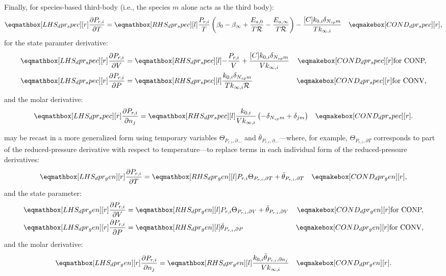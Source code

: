 \documentclass[12pt,number,sort&compress]{elsarticle}
\newcommand{\ns}{N_{sp}}
\newcommand{\conp}{CONP}
\newcommand{\conv}{CONV}
\newcommand{\dconp}{\ifmmode\text{for \conp,}\else for \conp,\fi}
\newcommand{\dconv}{\ifmmode\text{for \conv,}\else for \conv,\fi}
\newcommand{\Ru}{\mathcal{R}}
\begin{document}
Finally, for species-based third-body (i.e., the species $m$ alone acts as the third body):
\begin{align}
 \lhs{dpr_spec}{\frac{\partial P_{r, i} }{\partial T }} &=\rhs{dpr_spec}{\frac{P_{r, i}}{T} \left(\beta_{0} - \beta_{\infty} + \frac{E_{a, 0}}{T \Ru} - \frac{E_{a, \infty}}{T \Ru}\right) - \frac{[C] k_{0, i} \delta_{\ns m}}{T k_{\infty, i}}} & \cond{dpr_spec}{,} \label{e:dpr_spec_dt}
\end{align}
for the state paramter derivative:
\begin{subequations}
 \label{e:dpr_spec_de}
 \begin{align}
  \lhs{dpr_spec}{\frac{\partial P_{r, i} }{\partial V }} &= \rhs{dpr_spec}{- \frac{P_{r, i}}{V} + \frac{[C] k_{0, i} \delta_{\ns m}}{V k_{\infty, i}}} & \cond{dpr_spec}{\dconp}\\
  \lhs{dpr_spec}{\frac{\partial P_{r, i} }{\partial P }} &= \rhs{dpr_spec}{\frac{k_{0, i} \delta_{\ns m}}{T k_{\infty, i} \Ru}} & \cond{dpr_spec}{\dconv}
 \end{align}
\end{subequations}
and the molar derivative:
\begin{align}
 \lhs{dpr_spec}{\frac{\partial P_{r, i} }{\partial n_j }} &=\rhs{dpr_spec}{\frac{k_{0, i}}{V k_{\infty, i}} \left(- \delta_{\ns m} + \delta_{j m}\right)} & \cond{dpr_spec}{.} \label{e:dpr_spec_dnj}
\end{align}


 may be recast in a more generalized form using temporary variables $\Theta_{P_{r, i}, \partial \ldots}$ and $\bar{\theta}_{P_{r, i}, \partial \ldots}$---where, for example, $\Theta_{P_{r,i}, \partial T}$ corresponds to part of the reduced-pressure derivative with respect to temperature---to replace terms in each individual form of the reduced-pressure derivatives:
\begin{align}
 \lhs{dpr_gen}{\frac{\partial P_{r, i} }{\partial T } } &= \rhs{dpr_gen}{P_{r, i} \Theta_{P_{r,i}, \partial T} + \bar{\theta}_{P_{r, i}, \partial T}} & \cond{dpr_gen}{,} \label{e:dpr_dt}
\end{align}
and the state parameter:
\begin{subequations}
 \label{e:dpr_de}
 \begin{align}
  \lhs{dpr_gen}{\frac{\partial P_{r, i} }{\partial V}} &= \rhs{dpr_gen}{P_{r, i} \Theta_{P_{r,i}, \partial V} + \bar{\theta}_{P_{r, i}, \partial V}} & \cond{dpr_gen}{\dconp} \\
  \lhs{dpr_gen}{\frac{\partial P_{r, i} }{\partial P}} &= \rhs{dpr_gen}{\bar{\theta}_{P_{r, i}, \partial P}} & \cond{dpr_gen}{\dconv}
 \end{align}
\end{subequations}
and the molar derivative:
\begin{align}
 \lhs{dpr_gen}{\frac{\partial P_{r, i} }{\partial n_j}} &= \rhs{dpr_gen}{\frac{k_{0, i}\bar{\theta}_{P_{r, i}, \partial n_j}}{V k_{\infty, i}}} & \cond{dpr_gen}{.} \label{e:dpr_dnj}
\end{align}
\end{document}
